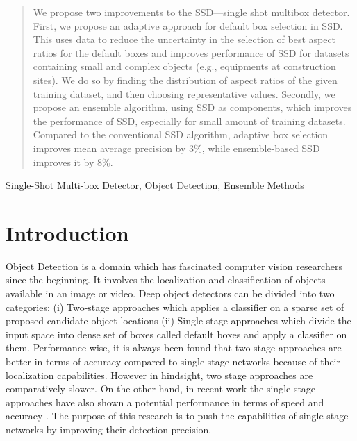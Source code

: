 \documentclass[conference]{IEEEtran}
\begin{document}
\begin{abstract}
We propose two improvements to the SSD---single shot multibox detector. First, we propose an adaptive approach for default box selection in SSD. This uses data to reduce the uncertainty in the selection of best aspect ratios for the default boxes and improves performance of SSD for datasets containing small and complex objects (e.g., equipments at construction sites). We do so by finding the distribution of aspect ratios of the given training dataset, and then choosing representative values. Secondly, we propose an ensemble algorithm, using SSD as components, which improves the performance of SSD, especially for small amount of training datasets. 
Compared to the conventional SSD algorithm, adaptive box selection improves mean average precision by 3\%, while ensemble-based SSD improves it by 8\%.
\end{abstract}

\begin{IEEEkeywords}
Single-Shot Multi-box Detector, Object Detection, Ensemble Methods
\end{IEEEkeywords}

\section{Introduction}
Object Detection is a domain which has fascinated computer vision researchers since the beginning. It involves the localization and classification of objects available in an image or video. Deep object detectors can be divided into two categories: (i) Two-stage approaches which applies a classifier on a sparse set of proposed candidate object locations (ii) Single-stage approaches which divide the input space into dense set of boxes called default boxes and apply a classifier on them. Performance wise, it is always been found that two stage approaches \cite{DBLP:journals/corr/HeGDG17,DBLP:journals/corr/RenHG015} are better in terms of accuracy compared to single-stage networks because of their localization capabilities. However in hindsight, two stage approaches are comparatively slower. On the other hand, in recent work \cite{DBLP:journals/corr/LiuAESR15,DBLP:journals/corr/RedmonF16,DBLP:journals/corr/FuLRTB17} the single-stage approaches have also shown a potential performance in terms of speed and accuracy \cite{DBLP:journals/corr/HuangRSZKFFWSG016}. The purpose of this research is to push the capabilities of single-stage networks by improving their detection precision.  
\end{document}
